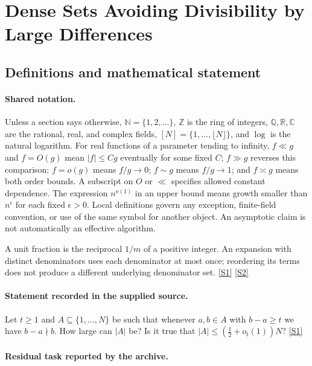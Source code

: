 \documentclass[11pt,a4paper]{article}
\newcommand{\N}{\mathbb{N}}
\newcommand{\Z}{\mathbb{Z}}
\newcommand{\Q}{\mathbb{Q}}
\newcommand{\R}{\mathbb{R}}
\newcommand{\C}{\mathbb{C}}
\newcommand{\sref}[2]{\hyperlink{source:#1:#2}{[S#2]}}
\begin{document}
\section{Dense Sets Avoiding Divisibility by Large Differences}\label{statement}


\subsection{Definitions and mathematical statement}

\paragraph{Shared notation.}Unless a section says otherwise, $\N=\{1,2,\ldots\}$,
$\Z$ is the ring of integers, $\Q,\R,\C$ are the rational, real, and complex
fields, $[N]=\{1,\ldots,\lfloor N\rfloor\}$, and $\log$ is the natural
logarithm. For real functions of a parameter tending to infinity,
$f\ll g$ and $f=O(g)$ mean $|f|\leq Cg$ eventually for some fixed $C$;
$f\gg g$ reverses this comparison; $f=o(g)$ means $f/g\to0$;
$f\sim g$ means $f/g\to1$; and $f\asymp g$ means both order bounds.
A subscript on $O$ or $\ll$ specifies allowed constant dependence.
The expression $n^{o(1)}$ in an upper bound means growth smaller than
$n^\epsilon$ for each fixed $\epsilon>0$. Local definitions govern any
exception, finite-field convention, or use of the same symbol for another
object. An asymptotic claim is not automatically an effective algorithm.



A unit fraction is the reciprocal $1/m$ of a positive integer. An expansion with distinct denominators uses each denominator at most once; reordering its terms does not produce a different underlying denominator set. \sref{statement}{1} \sref{statement}{2}

\paragraph{Statement recorded in the supplied source.}
Let $t\geq 1$ and $A\subseteq \{1,\ldots,N\}$ be such that whenever $a,b\in A$ with $b-a\geq t$ we have $b-a\nmid b$. How large can $\lvert A\rvert$ be? Is it true that $ \lvert A\rvert \leq \left(\frac{1}{2}+o_t(1)\right)N? $ \sref{statement}{1}

\paragraph{Residual task reported by the archive.}
\end{document}
